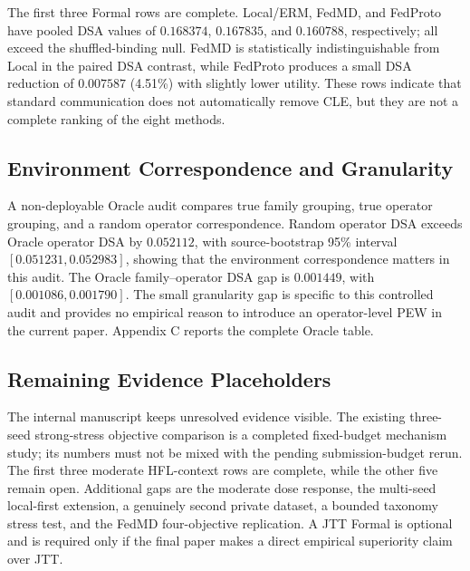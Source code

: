 

The first three Formal rows are complete. Local/ERM, FedMD, and FedProto have pooled DSA values of \(0.168374\), \(0.167835\), and \(0.160788\), respectively; all exceed the shuffled-binding null. FedMD is statistically indistinguishable from Local in the paired DSA contrast, while FedProto produces a small DSA reduction of \(0.007587\) (4.51\%) with slightly lower utility. These rows indicate that standard communication does not automatically remove CLE, but they are not a complete ranking of the eight methods.


\subsection{Environment Correspondence and Granularity}

A non-deployable Oracle audit compares true family grouping, true operator grouping, and a random operator correspondence. Random operator DSA exceeds Oracle operator DSA by \(0.052112\), with source-bootstrap 95\% interval \([0.051231,0.052983]\), showing that the environment correspondence matters in this audit. The Oracle family--operator DSA gap is \(0.001449\), with \([0.001086,0.001790]\). The small granularity gap is specific to this controlled audit and provides no empirical reason to introduce an operator-level PEW in the current paper. Appendix C reports the complete Oracle table.

\subsection{Remaining Evidence Placeholders}

The internal manuscript keeps unresolved evidence visible. The existing three-seed strong-stress objective comparison is a completed fixed-budget mechanism study; its numbers must not be mixed with the pending submission-budget rerun. The first three moderate HFL-context rows are complete, while the other five remain open. Additional gaps are the moderate dose response, the multi-seed local-first extension, a genuinely second private dataset, a bounded taxonomy stress test, and the FedMD four-objective replication. A JTT Formal is optional and is required only if the final paper makes a direct empirical superiority claim over JTT.


